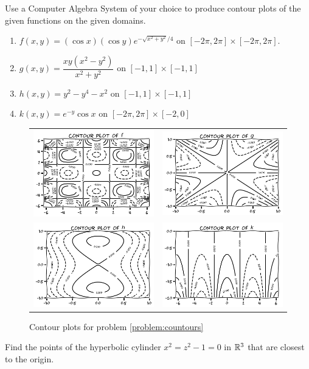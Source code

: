 \begin{problem}\label{problem:countours}
Use a Computer Algebra System of your choice to produce contour plots of the given functions on the given domains.
\begin{enumerate}
	\item $f(x,y) = (\cos x)(\cos y) e^{-\sqrt{x^2+y^2}/4}$ on $[-2\pi, 2\pi]\times [-2\pi, 2\pi]$.
	\item $g(x,y) = \dfrac{xy(x^2-y^2)}{x^2+y^2}$ on $[-1,1] \times [-1,1]$
	\item $h(x,y) = y^2 - y^4 -x^2$ on $[-1,1]\times[-1,1]$
	\item $k(x,y) = e^{-y}\cos x$ on $[-2\pi, 2\pi]\times[-2,0]$
\end{enumerate}
\begin{figure}[ht!]
\begin{tabular}{cc}
\includegraphics[width=0.5\linewidth]{contourf.png} &
\includegraphics[width=0.5\linewidth]{contourg.png} \\
\includegraphics[width=0.5\linewidth]{contourh.png} &
\includegraphics[width=0.5\linewidth]{contourk.png} 
\end{tabular}
\caption{Contour plots for problem \ref{problem:countours}}
\end{figure}
\end{problem}

\begin{problem} %
Find the points of the hyperbolic cylinder $x^2=z^2-1=0$ in $\mathbb{R}^3$ that are closest to the origin.
\end{problem}

